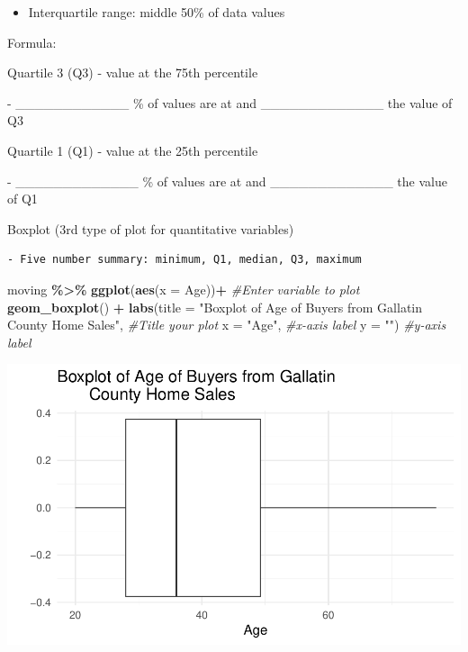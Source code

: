 \documentclass[
]{report}
\newenvironment{Shaded}{\begin{snugshade}}{\end{snugshade}}
\newcommand{\AttributeTok}[1]{\textcolor[rgb]{0.13,0.29,0.53}{#1}}
\newcommand{\CommentTok}[1]{\textcolor[rgb]{0.56,0.35,0.01}{\textit{#1}}}
\newcommand{\FunctionTok}[1]{\textcolor[rgb]{0.13,0.29,0.53}{\textbf{#1}}}
\newcommand{\NormalTok}[1]{#1}
\newcommand{\SpecialCharTok}[1]{\textcolor[rgb]{0.81,0.36,0.00}{\textbf{#1}}}
\newcommand{\StringTok}[1]{\textcolor[rgb]{0.31,0.60,0.02}{#1}}
\providecommand{\tightlist}{%
  \setlength{\itemsep}{0pt}\setlength{\parskip}{0pt}}
\newcommand{\rgi}{\hspace{24pt}}  %
\begin{document}
\begin{itemize}
\tightlist
\item
  Interquartile range: middle 50\% of data values
\end{itemize}

\rgi Formula:

\rgi \rgi Quartile 3 (Q3) - value at the 75th percentile

\rgi \rgi - \_\_\_\_\_\_\_\_\_\_\_\_ \% of values are at and \_\_\_\_\_\_\_\_\_\_\_\_\_ the value of Q3

\rgi \rgi Quartile 1 (Q1) - value at the 25th percentile

\rgi \rgi - \_\_\_\_\_\_\_\_\_\_\_\_\_ \% of values are at and \_\_\_\_\_\_\_\_\_\_\_\_\_ the value of Q1

\vspace{1mm}


\newpage

Boxplot (3rd type of plot for quantitative variables)

\begin{verbatim}
- Five number summary: minimum, Q1, median, Q3, maximum
\end{verbatim}

\vspace{0.3in}

\begin{Shaded}
\begin{Highlighting}[]
\NormalTok{moving }\SpecialCharTok{\%\textgreater{}\%}
  \FunctionTok{ggplot}\NormalTok{(}\FunctionTok{aes}\NormalTok{(}\AttributeTok{x =}\NormalTok{ Age))}\SpecialCharTok{+} \CommentTok{\#Enter variable to plot}
  \FunctionTok{geom\_boxplot}\NormalTok{() }\SpecialCharTok{+} 
  \FunctionTok{labs}\NormalTok{(}\AttributeTok{title =} \StringTok{"Boxplot of Age of Buyers from Gallatin }
\StringTok{       County Home Sales"}\NormalTok{, }\CommentTok{\#Title your plot}
       \AttributeTok{x =} \StringTok{"Age"}\NormalTok{, }\CommentTok{\#x{-}axis label}
       \AttributeTok{y =} \StringTok{""}\NormalTok{) }\CommentTok{\#y{-}axis label}
\end{Highlighting}
\end{Shaded}

\begin{center}\includegraphics[width=0.7\linewidth]{06-VN06-EDAonemeanSim_files/figure-latex/unnamed-chunk-4-1} \end{center}
\end{document}
